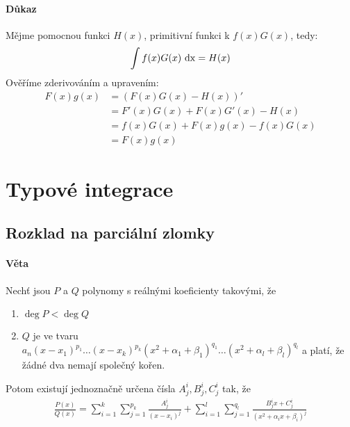 \documentclass[a4paper,10pt]{article}
\begin{document}
\begin{enumerate}
\paragraph{Důkaz}
Mějme pomocnou funkci $H(x)$, primitivní funkci k $f(x)G(x)$, tedy:
    \begin{align}
    	\int f(x)G(x) \operatorname*{\,dx} = H(x)
    \end{align}
Ověříme zderivováním a upravením:
    \begin{align}
    	F(x)g(x) &= (F(x)G(x) - H(x))' \nonumber \\
                &= F'(x)G(x) + F(x)G'(x) - H(x) \nonumber \\
                &= f(x)G(x) + F(x)g(x) - f(x)G(x) \nonumber \\
                &=F(x)g(x)                
    \end{align}
\end{enumerate}

\newpage
\section{Typové integrace}
\subsection{Rozklad na parciální zlomky}
\setcounter{equation}{0}
\paragraph{Věta}
Nechť jsou $P$ a $Q$ polynomy s reálnými koeficienty takovými, že
\begin{enumerate}
	\item $\deg P < \deg Q$
	\item $Q$ je ve tvaru $ a_n (x-x_1)^{p_1} \dots (x-x_k)^{p_k} 
		(x^2+{\alpha}_1+{\beta}_1)^{q_1} \dots (x^2+{\alpha}_l+{\beta}_l)^{q_l} $
		a platí, že žádné dva nemají společný kořen.
\end{enumerate}
Potom existují jednoznačně určena čísla $ A^i_j, B^i_j, C^i_j $  tak, že
\begin{align*}
	\frac{P(x)}{Q(x)} = \sum_{i=1}^{k} \sum_{j=1}^{p_k} \frac{A^i_j}{(x-x_i)^{j}} 
	+ \sum_{i=1}^l \sum_{j=1}^{q_l} \frac{B^i_jx+C^i_j}{(x^2+{\alpha}_ix+{\beta}_i)^{j}} 
\end{align*}
\end{document}
